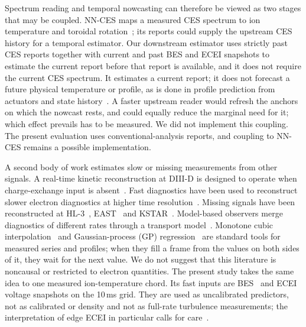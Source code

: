 Spectrum reading and temporal nowcasting can therefore be viewed as two stages that may be coupled. NN-CES maps a measured CES spectrum to ion temperature and toroidal rotation~\citep{Lee2026NeuralNetworkbased}; its reports could supply the upstream CES history for a temporal estimator. Our downstream estimator uses strictly past CES reports together with current and past BES and ECEI snapshots to estimate the current report before that report is available, and it does not require the current CES spectrum. It estimates a current report; it does not forecast a future physical temperature or profile, as is done in profile prediction from actuators and state history~\citep{Abbate2021DatadrivenProfile}. A faster upstream reader would refresh the anchors on which the nowcast rests, and could equally reduce the marginal need for it; which effect prevails has to be measured. We did not implement this coupling. The present evaluation uses conventional-analysis reports, and coupling to NN-CES remains a possible implementation.

A second body of work estimates slow or missing measurements from other signals. A real-time kinetic reconstruction at DIII-D is designed to operate when charge-exchange input is absent~\citep{Shousha2023MachineLearningbased}. Fast diagnostics have been used to reconstruct slower electron diagnostics at higher time resolution~\citep{Jalalvand2025MultimodalSuperresolution,Imrek2026TemporalSuperresolution}. Missing signals have been reconstructed at HL-3~\citep{Yang2026FusionmaeSelfsupervised}, EAST~\citep{Wang2025TimeSeries} and KSTAR~\citep{Joung2018ImputationFaulty}. Model-based observers merge diagnostics of different rates through a transport model~\citep{Pastore2023ModelBased,Morosohk2023RealTime}. Monotone cubic interpolation~\citep{fritsch1980} and Gaussian-process (GP) regression~\citep{chilenski2015,Kim2024KineticProfile} are standard tools for measured series and profiles; when they fill a frame from the values on both sides of it, they wait for the next value. We do not suggest that this literature is noncausal or restricted to electron quantities. The present study takes the same idea to one measured ion-temperature chord. Its fast inputs are BES~\citep{Lampert2015CombinedHydrogen} and ECEI~\citep{Yun2014Quasi3d} voltage snapshots on the 10\,ms grid. They are used as uncalibrated predictors, not as calibrated \Te{} or density and not as full-rate turbulence measurements; the interpretation of edge ECEI in particular calls for care~\citep{Vanovac2018EffectsDensity}.

